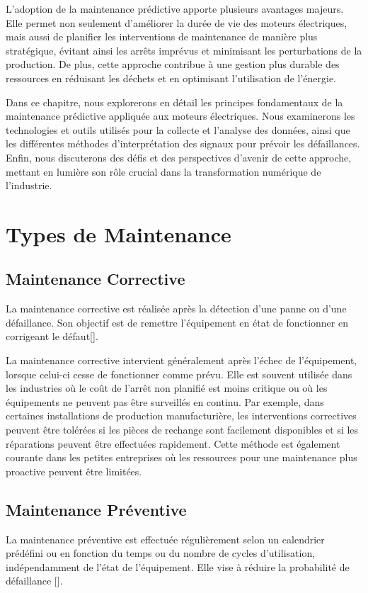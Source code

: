 L'adoption de la maintenance prédictive apporte plusieurs avantages majeurs.
Elle permet non seulement d'améliorer la durée de vie des moteurs électriques,
mais aussi de planifier les interventions de maintenance de manière plus
stratégique, évitant ainsi les arrêts imprévus et minimisant les perturbations
de la production. De plus, cette approche contribue à une gestion plus durable
des ressources en réduisant les déchets et en optimisant l'utilisation de
l'énergie.

Dans ce chapitre, nous explorerons en détail les principes fondamentaux de la
maintenance prédictive appliquée aux moteurs électriques. Nous examinerons les
technologies et outils utilisés pour la collecte et l'analyse des données,
ainsi que les différentes méthodes d'interprétation des signaux pour prévoir
les défaillances. Enfin, nous discuterons des défis et des perspectives
d'avenir de cette approche, mettant en lumière son rôle crucial dans la
transformation numérique de l'industrie.

\section{Types de Maintenance}

\subsection{Maintenance Corrective}
La maintenance corrective est réalisée après la détection d’une panne ou d’une
défaillance. Son objectif est de remettre l’équipement en état de fonctionner
en corrigeant le défaut[\cite{Sezdi2019}].

La maintenance corrective intervient généralement après l'échec de
l'équipement, lorsque celui-ci cesse de fonctionner comme prévu. Elle est
souvent utilisée dans les industries où le coût de l'arrêt non planifié est
moins critique ou où les équipements ne peuvent pas être surveillés en continu.
Par exemple, dans certaines installations de production manufacturière, les
interventions correctives peuvent être tolérées si les pièces de rechange sont
facilement disponibles et si les réparations peuvent être effectuées
rapidement. Cette méthode est également courante dans les petites entreprises
où les ressources pour une maintenance plus proactive peuvent être limitées.

\subsection{Maintenance Préventive}
La maintenance préventive est effectuée régulièrement selon un calendrier
prédéfini ou en fonction du temps ou du nombre de cycles d’utilisation,
indépendamment de l’état de l’équipement. Elle vise à réduire la probabilité de
défaillance [\cite{Sezdi2019}].

